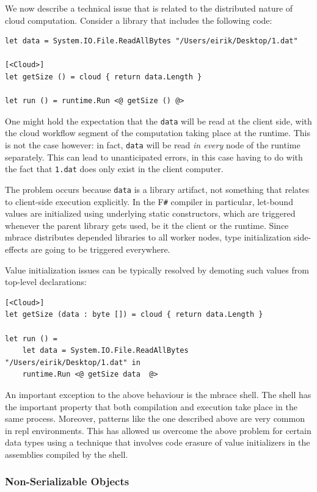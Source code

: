 \documentclass[9pt,a4paper]{article}
\newcommand{\mbrace}{mbrace}
\newcommand{\fsharp}{F\texttt \#}
\begin{document}
We now describe a technical issue that is related to the distributed nature of cloud computation.
Consider a library that includes the following code:
\begin{lstlisting}
let data = System.IO.File.ReadAllBytes "/Users/eirik/Desktop/1.dat"

[<Cloud>]
let getSize () = cloud { return data.Length }

let run () = runtime.Run <@ getSize () @>
\end{lstlisting}
One might hold the expectation that the \texttt{data} will be read at the client side,
with the cloud workflow segment of the computation taking place at the runtime.
This is not the case however: in fact, \texttt{data} will be read \emph{in every}
node of the runtime separately. This can lead to unanticipated errors, in this case
having to do with the fact that \texttt{1.dat} does only exist in the client computer.

The problem occurs because \texttt{data} is a library artifact, not something
that relates to client-side execution explicitly. In the \fsharp{} compiler in particular,
let-bound values are initialized using underlying static constructors, which are triggered
whenever the parent library gets used, be it the client or the runtime.
Since \mbrace{} distributes depended libraries to all worker nodes, type initialization 
side-effects are going to be triggered everywhere.

Value initialization issues can be typically resolved by demoting such values from top-level
declarations:
\begin{lstlisting}
[<Cloud>]
let getSize (data : byte []) = cloud { return data.Length }

let run () = 
	let data = System.IO.File.ReadAllBytes "/Users/eirik/Desktop/1.dat" in
	runtime.Run <@ getSize data  @>
\end{lstlisting}

An important exception to the above behaviour is the \mbrace{} shell. The shell has the 
important property that both compilation and execution take place in the same process. 
Moreover, patterns like the one described above are very common in repl environments.
This has allowed us overcome the above problem for certain data types using a technique
that involves code erasure of value initializers in the assemblies compiled by the shell.

\subsubsection*{Non-Serializable Objects}
\end{document}
